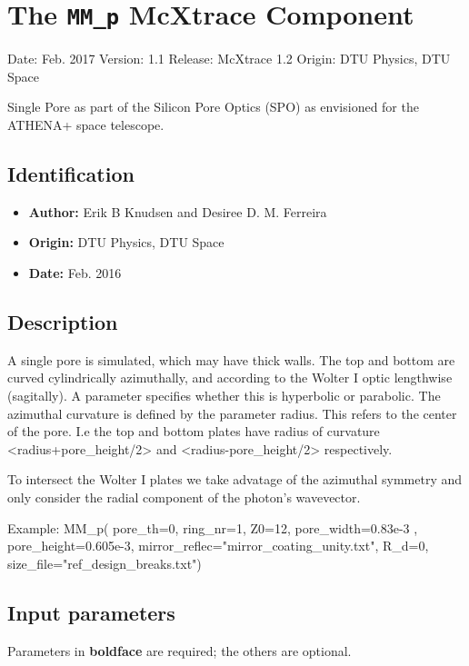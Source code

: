 \section{The \texttt{MM\_p} McXtrace Component}
Date: Feb. 2017
Version: 1.1
Release: McXtrace 1.2
Origin: DTU Physics, DTU Space

Single Pore as part of the Silicon Pore Optics (SPO) as envisioned for the ATHENA+ space telescope.

\subsection*{Identification}
\begin{itemize}
  \item \textbf{Author:} Erik B Knudsen and Desiree D. M. Ferreira
  \item \textbf{Origin:} DTU Physics, DTU Space
  \item \textbf{Date:} Feb. 2016
\end{itemize}

\subsection*{Description}
A single pore is simulated, which may have thick walls. The top and bottom are curved cylindrically azimuthally, and according to the Wolter I optic lengthwise (sagitally). A parameter specifies whether this is hyperbolic or parabolic. The azimuthal curvature is defined by the parameter radius. This refers to the center of the pore. I.e the top and bottom plates have radius of curvature \textless{}radius+pore\_height/2\textgreater{} and \textless{}radius-pore\_height/2\textgreater{} respectively.

To intersect the Wolter I plates we take advatage of the azimuthal symmetry and only consider the radial component of the photon's wavevector.

Example: MM\_p( pore\_th=0, ring\_nr=1, Z0=12, pore\_width=0.83e-3 , pore\_height=0.605e-3, mirror\_reflec="mirror\_coating\_unity.txt", R\_d=0, size\_file="ref\_design\_breaks.txt")

\subsection*{Input parameters}
Parameters in \textbf{boldface} are required; the others are optional.


